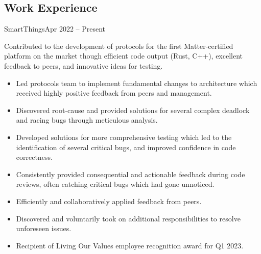 \documentclass[
  9pt, %
]{FreemanCV}
\begin{document}
\begin{paracol}{2} %


\section{Work Experience}


\begin{employer}{SmartThings}{Apr 2022 -- Present}
  \begin{jobentry}{
  }
    Contributed to the development of protocols for the first Matter-certified
    platform on the market though efficient code output (Rust, C++), excellent feedback to
    peers, and innovative ideas for testing.\vspace{1ex}

    \begin{itemize}[
      itemsep=0.75ex,
      parsep=0ex,
      topsep=0pt,
      labelindent=0.5em,
      leftmargin=*,
      font=\normalsize
    ]
      \item Led protocols team to implement fundamental changes to architecture which
            received highly positive feedback from peers and management.
      \item Discovered root-cause and provided solutions for several complex deadlock and
            racing bugs through meticulous analysis.
      \item Developed solutions for more comprehensive testing which led to the identification of
            several critical bugs, and improved confidence in code correctness.
      \item Consistently provided consequential and actionable feedback during code reviews,
            often catching critical bugs which had gone unnoticed.
      \item Efficiently and collaboratively applied feedback from peers.
      \item Discovered and voluntarily took on additional responsibilities to resolve
            unforeseen issues.
      \item Recipient of Living Our Values employee recognition award for Q1 2023.
    \end{itemize}
  \end{jobentry}
\end{employer}


\end{paracol}
\end{document}
